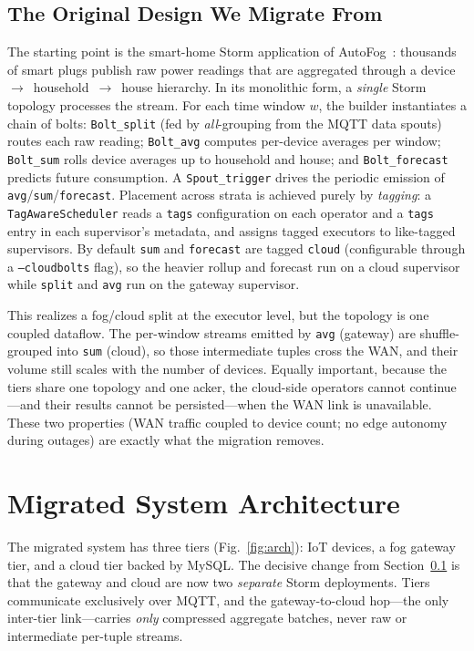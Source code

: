 \documentclass[conference]{IEEEtran}
\newcommand{\code}[1]{\texttt{#1}}
\begin{document}
\subsection{The Original Design We Migrate From}\label{sec:related-orig}
The starting point is the smart-home Storm application of
AutoFog~\cite{pham2021}: thousands of smart plugs publish raw power readings that
are aggregated through a device~$\to$~household~$\to$~house hierarchy. In its
monolithic form, a \emph{single} Storm topology processes the stream. For each
time window $w$, the builder instantiates a chain of bolts:
\code{Bolt\_split} (fed by \emph{all}-grouping from the MQTT data spouts) routes
each raw reading; \code{Bolt\_avg} computes per-device averages per window;
\code{Bolt\_sum} rolls device averages up to household and house; and
\code{Bolt\_forecast} predicts future consumption. A \code{Spout\_trigger} drives
the periodic emission of \code{avg}/\code{sum}/\code{forecast}. Placement across
strata is achieved purely by \emph{tagging}: a \code{TagAwareScheduler} reads a
\code{tags} configuration on each operator and a \code{tags} entry in each
supervisor's metadata, and assigns tagged executors to like-tagged supervisors.
By default \code{sum} and \code{forecast} are tagged \code{cloud} (configurable
through a \code{--cloudbolts} flag), so the heavier rollup and forecast run on a
cloud supervisor while \code{split} and \code{avg} run on the gateway supervisor.

This realizes a fog/cloud split at the executor level, but the topology is one
coupled dataflow. The per-window streams emitted by \code{avg} (gateway) are
shuffle-grouped into \code{sum} (cloud), so those intermediate tuples cross the
WAN, and their volume still scales with the number of devices. Equally important,
because the tiers share one topology and one acker, the cloud-side operators
cannot continue---and their results cannot be persisted---when the WAN link is
unavailable. These two properties (WAN traffic coupled to device count;
no edge autonomy during outages) are exactly what the migration removes.

\section{Migrated System Architecture}\label{sec:arch}
The migrated system has three tiers (Fig.~\ref{fig:arch}): IoT devices, a fog
gateway tier, and a cloud tier backed by MySQL. The decisive change from
Section~\ref{sec:related-orig} is that the gateway and cloud are now two
\emph{separate} Storm deployments. Tiers communicate exclusively over MQTT, and
the gateway-to-cloud hop---the only inter-tier link---carries \emph{only}
compressed aggregate batches, never raw or intermediate per-tuple streams.
\end{document}
